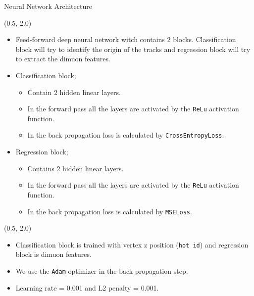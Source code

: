 \documentclass[12pt, xcolor={dvipsnames}, aspectratio = 169, sans,mathserif]{beamer}
\begin{document}
\begin{frame}[fragile]{Neural Network Architecture}

\begin{textblock}{15.0}(0.5, 2.0)
\begin{itemize}

	\item Feed-forward deep neural network witch contains 2 blocks. Classification block will try to identify the origin of the tracks and regression block will try to extract the dimuon features.

	\item Classification block;

	\begin{itemize}

		\item Contain 2 hidden linear layers.

		\item In the forward pass all the layers are activated by the \verb|ReLu| activation function.

		\item In the back propagation loss is calculated by \verb|CrossEntropyLoss|.

	\end{itemize}

	\item Regression block;

	\begin{itemize}

		\item Contains 2 hidden linear layers.

		\item In the forward pass all the layers are activated by the \verb|ReLu| activation function.

		\item In the back propagation loss is calculated by \verb|MSELoss|.

	\end{itemize}

\end{itemize}
\end{textblock}

\end{frame}

\begin{frame}[fragile]
\begin{textblock}{15.0}(0.5, 2.0)
\begin{itemize}

	\item Classification block is trained with vertex z position (\verb|hot id|) and regression block is dimuon features.

	\item We use the \verb|Adam| optimizer in the back propagation step.

	\item Learning rate = 0.001 and L2 penalty = 0.001.

\end{itemize}
\end{textblock}
\end{frame}
\end{document}
